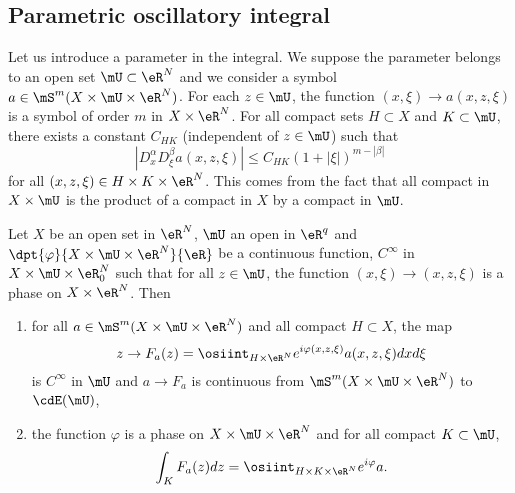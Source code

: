 \subsection{Parametric oscillatory integral}

Let us introduce a parameter in the integral. We suppose the parameter belongs to an open set $\mU\subset\eR^N$ and we consider a symbol $a\in\mS^m(X\times\mU\times\eR^N)$. For each $z\in\mU$, the function $(x,\xi)\to a(x,z,\xi)$ is a symbol of order $m$ in $X\times\eR^N$. For all compact sets $H\subset X$ and $K\subset\mU$, there exists a constant $C_{HK}$ (independent of $z\in\mU$) such that 
\begin{equation}
| D^{\alpha}_xD^{\beta}_{\xi}a(x,z,\xi) |\leq C_{HK}(1+| \xi |)^{m-| \beta |}
\end{equation}
for all $(x,z,\xi)\in H\times K\times\eR^N$. This comes from the fact that all compact in $X\times\mU$ is the product of a compact in $X$ by a compact in $\mU$.


\begin{theorem}
Let $X$ be an open set in $\eR^N$, $\mU$ an open in $\eR^q$ and $\dpt{\varphi}{X\times\mU\times\eR^N}{\eR}$ be a continuous function, $C^{\infty}$ in $X\times\mU\times\eR^N_0$ such that for all $z\in\mU$, the function $(x,\xi)\to(x,z,\xi)$ is a phase on $X\times\eR^N$. Then

\begin{enumerate}
\item for all $a\in\mS^m(X\times\mU\times\eR^N)$ and all compact $H\subset X$, the map
\[ 
  z\to F_a(z)=\osiint_{H\times\eR^N}e^{i\varphi(x,z,\xi)}a(x,z,\xi)dxd\xi
\]
is $C^{\infty}$ in $\mU$ and $a\to F_a$ is continuous from $\mS^m(X\times\mU\times\eR^N)$ to $\cdE(\mU)$,

\item the function $\varphi$ is a phase on $X\times\mU\times\eR^N$ and for all compact $K\subset\mU$,
\begin{equation} \label{eq:intKFa}
  \int_K F_a(z)dz=\osiint_{H\times K\times\eR^N}e^{i\varphi}a.
\end{equation}

\end{enumerate}

\end{theorem}

